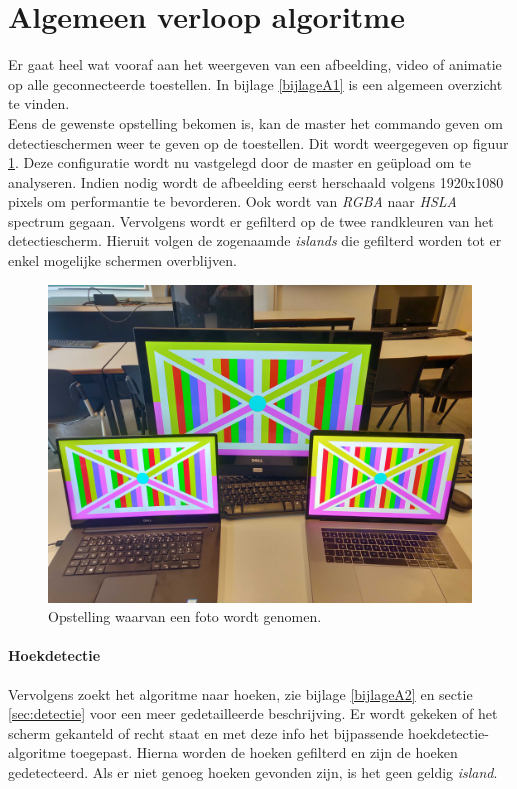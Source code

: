 \section{Algemeen verloop algoritme}
Er gaat heel wat vooraf aan het weergeven van een afbeelding, video of animatie op alle geconnecteerde toestellen. In bijlage \ref{bijlageA1} is een algemeen overzicht te vinden.\\[3mm]
Eens de gewenste opstelling bekomen is, kan de master het commando geven om detectieschermen weer te geven op de toestellen. Dit wordt weergegeven op figuur \ref{fig:opstelling}. Deze configuratie wordt nu vastgelegd door de master en geüpload om te analyseren. Indien nodig wordt de afbeelding eerst herschaald volgens 1920x1080 pixels om performantie te bevorderen. Ook wordt van {\it RGBA} naar {\it HSLA} spectrum gegaan. Vervolgens wordt er gefilterd op de twee randkleuren van het detectiescherm. Hieruit volgen de zogenaamde {\it islands} die gefilterd worden tot er enkel mogelijke schermen overblijven.

\begin{figure}[H]
	\centering
	\includegraphics[scale=0.06]{img/opstelling.jpg}
	\caption{Opstelling waarvan een foto wordt genomen.}
	\label{fig:opstelling}
\end{figure}

\paragraph{Hoekdetectie}
Vervolgens zoekt het algoritme naar hoeken, zie bijlage \ref{bijlageA2} en sectie \ref{sec:detectie} voor een meer gedetailleerde beschrijving. Er wordt gekeken of het scherm gekanteld of recht staat en met deze info het bijpassende hoekdetectie-algoritme toegepast. Hierna worden de hoeken gefilterd en zijn de hoeken gedetecteerd. Als er niet genoeg hoeken gevonden zijn, is het geen geldig {\it island}.

